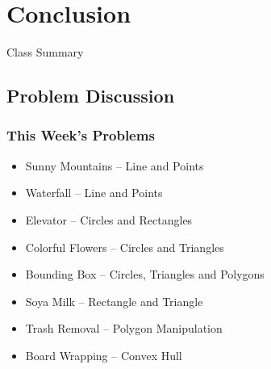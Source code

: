 \section{Conclusion}

\begin{frame}{Class Summary}
\end{frame}

\subsection{Problem Discussion}
\begin{frame}
  \frametitle{This Week's Problems}
  \begin{itemize}
    \item Sunny Mountains -- Line and Points
    \item Waterfall -- Line and Points
    \item Elevator -- Circles and Rectangles
    \item Colorful Flowers -- Circles and Triangles
    \item Bounding Box -- Circles, Triangles and Polygons
    \item Soya Milk -- Rectangle and Triangle
    \item Trash Removal -- Polygon Manipulation
    \item Board Wrapping -- Convex Hull
  \end{itemize}
\end{frame}
